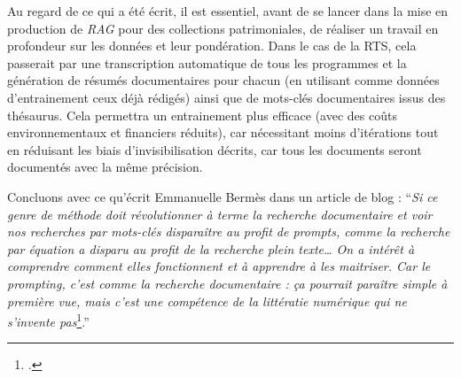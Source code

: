 Au regard de ce qui a été écrit, il est essentiel, avant de se lancer dans la mise en production de \textit{RAG} pour des collections patrimoniales, de réaliser un travail en profondeur sur les données et leur pondération. Dans le cas de la RTS, cela passerait par une transcription automatique de tous les programmes et la génération de résumés documentaires pour chacun (en utilisant comme données d’entrainement ceux déjà rédigés) ainsi que de mots-clés documentaires issus des thésaurus. Cela permettra un entrainement plus efficace (avec des coûts environnementaux et financiers réduits), car nécessitant moins d’itérations tout en réduisant les biais d’invisibilisation décrits, car tous les documents seront documentés avec la même précision.

Concluons avec ce qu’écrit Emmanuelle Bermès dans un article de blog : \enquote{\textit{Si ce genre de méthode doit révolutionner à terme la recherche documentaire et voir nos recherches par mots-clés disparaître au profit de \textit{prompts}, comme la recherche par équation a disparu au profit de la recherche plein texte… On a intérêt à comprendre comment elles fonctionnent et à apprendre à les maitriser. Car le \textit{prompting}, c’est comme la recherche documentaire : ça pourrait paraître simple à première vue, mais c’est une compétence de la littératie numérique qui ne s’invente pas}\footcite{bermes_futur_2024}.}

